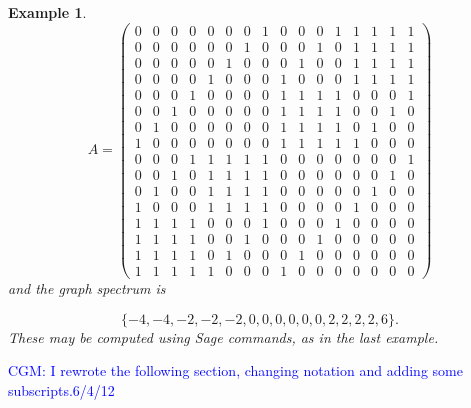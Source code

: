 \documentclass[12pt]{article}
\def\blue#1{\textcolor{blue}{#1}}
\newcommand{\cgm}[1]{\blue{CGM: #1}}
\newtheorem{example}[theorem]{Example}
\newcommand{\Hcal}{{\mathcal{H}}}
\begin{document}
\begin{example}
{\small{
\[
A =
\left(\begin{array}{rrrrrrrrrrrrrrrr}
0 & 0 & 0 & 0 & 0 & 0 & 0 & 1 & 0 & 0 & 0 & 1 & 1 & 1 & 1 & 1 \\
0 & 0 & 0 & 0 & 0 & 0 & 1 & 0 & 0 & 0 & 1 & 0 & 1 & 1 & 1 & 1 \\
0 & 0 & 0 & 0 & 0 & 1 & 0 & 0 & 0 & 1 & 0 & 0 & 1 & 1 & 1 & 1 \\
0 & 0 & 0 & 0 & 1 & 0 & 0 & 0 & 1 & 0 & 0 & 0 & 1 & 1 & 1 & 1 \\
0 & 0 & 0 & 1 & 0 & 0 & 0 & 0 & 1 & 1 & 1 & 1 & 0 & 0 & 0 & 1 \\
0 & 0 & 1 & 0 & 0 & 0 & 0 & 0 & 1 & 1 & 1 & 1 & 0 & 0 & 1 & 0 \\
0 & 1 & 0 & 0 & 0 & 0 & 0 & 0 & 1 & 1 & 1 & 1 & 0 & 1 & 0 & 0 \\
1 & 0 & 0 & 0 & 0 & 0 & 0 & 0 & 1 & 1 & 1 & 1 & 1 & 0 & 0 & 0 \\
0 & 0 & 0 & 1 & 1 & 1 & 1 & 1 & 0 & 0 & 0 & 0 & 0 & 0 & 0 & 1 \\
0 & 0 & 1 & 0 & 1 & 1 & 1 & 1 & 0 & 0 & 0 & 0 & 0 & 0 & 1 & 0 \\
0 & 1 & 0 & 0 & 1 & 1 & 1 & 1 & 0 & 0 & 0 & 0 & 0 & 1 & 0 & 0 \\
1 & 0 & 0 & 0 & 1 & 1 & 1 & 1 & 0 & 0 & 0 & 0 & 1 & 0 & 0 & 0 \\
1 & 1 & 1 & 1 & 0 & 0 & 0 & 1 & 0 & 0 & 0 & 1 & 0 & 0 & 0 & 0 \\
1 & 1 & 1 & 1 & 0 & 0 & 1 & 0 & 0 & 0 & 1 & 0 & 0 & 0 & 0 & 0 \\
1 & 1 & 1 & 1 & 0 & 1 & 0 & 0 & 0 & 1 & 0 & 0 & 0 & 0 & 0 & 0 \\
1 & 1 & 1 & 1 & 1 & 0 & 0 & 0 & 1 & 0 & 0 & 0 & 0 & 0 & 0 & 0
\end{array}\right)
\]
}}
and the graph spectrum is

\[
\{ -4, -4, -2, -2, -2, 0, 0, 0, 0, 0, 0, 2, 2, 2, 2, 6\}.
\]
These may be computed using Sage commands, as in the last example.


\end{example}



\cgm{I rewrote the following section, changing notation and adding some subscripts.6/4/12}
\end{document}
